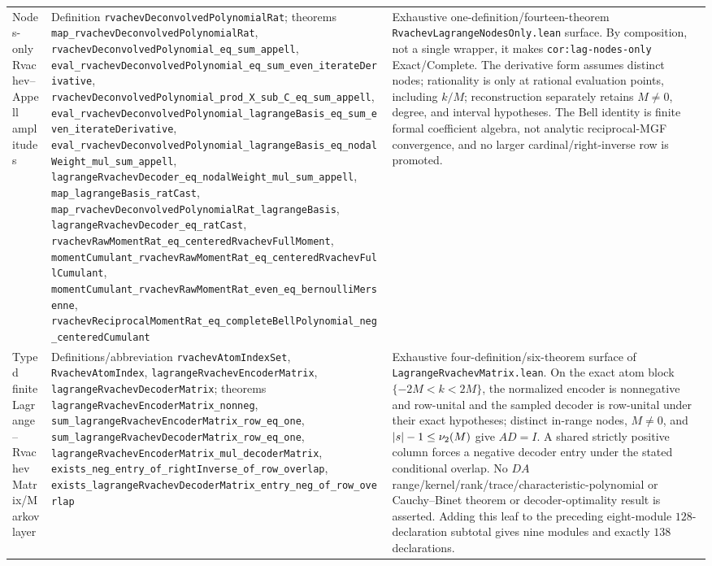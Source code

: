 \documentclass[11pt,oneside]{article}
\theoremstyle{definition}
\theoremstyle{remark}
\begin{document}
\begin{longtable}{@{}>{\raggedright\arraybackslash}p{} >{\raggedright\arraybackslash}p{} >{\raggedright\arraybackslash}p{}@{}}
Nodes-only Rvachev--Appell amplitudes & Definition \nolinkurl{rvachevDeconvolvedPolynomialRat}; theorems \nolinkurl{map_rvachevDeconvolvedPolynomialRat}, \nolinkurl{rvachevDeconvolvedPolynomial_eq_sum_appell}, \nolinkurl{eval_rvachevDeconvolvedPolynomial_eq_sum_even_iterateDerivative}, \nolinkurl{rvachevDeconvolvedPolynomial_prod_X_sub_C_eq_sum_appell}, \nolinkurl{eval_rvachevDeconvolvedPolynomial_lagrangeBasis_eq_sum_even_iterateDerivative}, \nolinkurl{eval_rvachevDeconvolvedPolynomial_lagrangeBasis_eq_nodalWeight_mul_sum_appell}, \nolinkurl{lagrangeRvachevDecoder_eq_nodalWeight_mul_sum_appell}, \nolinkurl{map_lagrangeBasis_ratCast}, \nolinkurl{map_rvachevDeconvolvedPolynomialRat_lagrangeBasis}, \nolinkurl{lagrangeRvachevDecoder_eq_ratCast}, \nolinkurl{rvachevRawMomentRat_eq_centeredRvachevFullMoment}, \nolinkurl{momentCumulant_rvachevRawMomentRat_eq_centeredRvachevFullCumulant}, \nolinkurl{momentCumulant_rvachevRawMomentRat_even_eq_bernoulliMersenne}, \nolinkurl{rvachevReciprocalMomentRat_eq_completeBellPolynomial_neg_centeredCumulant} & Exhaustive one-definition/fourteen-theorem \nolinkurl{RvachevLagrangeNodesOnly.lean} surface.  By composition, not a single wrapper, it makes \nolinkurl{cor:lag-nodes-only} Exact/Complete.  The derivative form assumes distinct nodes; rationality is only at rational evaluation points, including \(k/M\); reconstruction separately retains \(M\ne0\), degree, and interval hypotheses.  The Bell identity is finite formal coefficient algebra, not analytic reciprocal-MGF convergence, and no larger cardinal/right-inverse row is promoted. \\
Typed finite Lagrange--Rvachev Matrix/Markov layer & Definitions/abbreviation \nolinkurl{rvachevAtomIndexSet}, \nolinkurl{RvachevAtomIndex}, \nolinkurl{lagrangeRvachevEncoderMatrix}, \nolinkurl{lagrangeRvachevDecoderMatrix}; theorems \nolinkurl{lagrangeRvachevEncoderMatrix_nonneg}, \nolinkurl{sum_lagrangeRvachevEncoderMatrix_row_eq_one}, \nolinkurl{sum_lagrangeRvachevDecoderMatrix_row_eq_one}, \nolinkurl{lagrangeRvachevEncoderMatrix_mul_decoderMatrix}, \nolinkurl{exists_neg_entry_of_rightInverse_of_row_overlap}, \nolinkurl{exists_lagrangeRvachevDecoderMatrix_entry_neg_of_row_overlap} & Exhaustive four-definition/six-theorem surface of \nolinkurl{LagrangeRvachevMatrix.lean}.  On the exact atom block \(\{-2M<k<2M\}\), the normalized encoder is nonnegative and row-unital and the sampled decoder is row-unital under their exact hypotheses; distinct in-range nodes, \(M\ne0\), and \(\lvert s\rvert-1\le\nu_{2}(M)\) give \(AD=I\).  A shared strictly positive column forces a negative decoder entry under the stated conditional overlap.  No \(DA\) range/\allowbreak{}kernel/\allowbreak{}rank/\allowbreak{}trace/\allowbreak{}characteristic-polynomial or Cauchy--Binet theorem or decoder-optimality result is asserted.  Adding this leaf to the preceding eight-module \(128\)-declaration subtotal gives nine modules and exactly \(138\) declarations. \\

\end{longtable}
\end{document}
